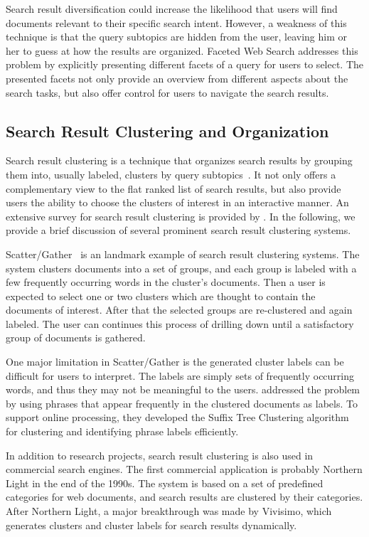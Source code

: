 Search result diversification could increase the likelihood that users will
find documents relevant to their specific search intent. However, a weakness of this technique is that the query subtopics are hidden from the user, leaving him or her to guess at how the results are organized. Faceted Web Search addresses this problem by explicitly presenting different facets of a query for users to select. The presented facets not only provide an overview from different aspects about the search tasks, but also offer control for users to navigate the search results.

\subsection{Search Result Clustering and Organization}
Search result clustering is a technique that organizes search results by grouping them into, usually labeled, clusters by query subtopics~\cite{cutting1992scatter,kaki2005findex,zamir1999grouper,carpineto2009survey}. It not only offers a complementary view to the flat ranked list of search results, but also provide users the ability to choose the clusters of interest in an interactive manner. An extensive survey for search result clustering is provided by \citet{carpineto2009survey}. In the following, we provide a brief discussion of several prominent search result clustering systems.

Scatter/Gather~\cite{cutting1992scatter,hearst1996reexamining} is an landmark example of search result clustering systems. The system clusters documents into a set of groups, and each group is labeled with a few frequently occurring words in the cluster's documents. Then a user is expected to select one or two clusters which are thought to contain the documents of interest. After that the selected groups are re-clustered and again labeled. The user can continues this process of drilling down until a satisfactory group of documents is gathered.

One major limitation in Scatter/Gather is the generated cluster labels can be difficult for users to interpret. The labels are simply sets of frequently occurring words, and thus they may not be meaningful to the users. \citet{zamir1999grouper,zamir1998web} addressed the problem by using phrases that appear frequently in the clustered documents as labels. To support online processing, they developed the Suffix Tree Clustering algorithm for clustering and identifying phrase labels efficiently.

In addition to research projects, search result clustering is also used in commercial search engines. The first commercial application is probably Northern Light in the end of the 1990s. The system is based on a set of predefined categories for web documents, and search results are clustered by their categories. After Northern Light, a major breakthrough was made by Vivisimo, which generates clusters and cluster labels for search results dynamically. 

